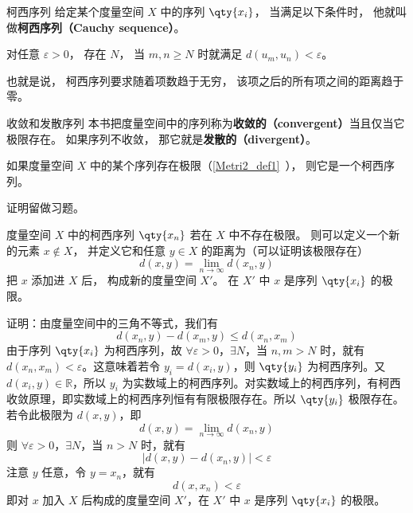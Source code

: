 

\begin{definition}{柯西序列}
给定某个度量空间 $X$ 中的序列 $\qty{x_i}$， 当满足以下条件时， 他就叫做\textbf{柯西序列（Cauchy sequence）}。

对任意 $\varepsilon > 0$， 存在 $N$， 当 $m, n \geqslant N$ 时就满足 $d(u_m, u_n) < \varepsilon$。
\end{definition}
也就是说， 柯西序列要求随着项数趋于无穷， 该项之后的所有项之间的距离趋于零。

\begin{definition}{收敛和发散序列}\label{cauchy_def1}
本书把度量空间中的序列称为\textbf{收敛的（convergent）}当且仅当它极限存在。 如果序列不收敛， 那它就是\textbf{发散的（divergent）}。
\end{definition}

\begin{theorem}{}
如果度量空间 $X$ 中的某个序列存在极限（\autoref{Metri2_def1}~）， 则它是一个柯西序列。
\end{theorem}
证明留做习题。

\begin{theorem}{}\label{cauchy_the1}
度量空间 $X$ 中的柯西序列 $\qty{x_n}$ 若在 $X$ 中不存在极限。 则可以定义一个新的元素 $x \notin X$， 并定义它和任意 $y\in X$ 的距离为（可以证明该极限存在）
\begin{equation}
d(x, y) = \lim_{n\to\infty} d(x_n, y)
\end{equation}
把 $x$ 添加进 $X$ 后， 构成新的度量空间 $X'$。 在 $X'$ 中 $x$ 是序列 $\qty{x_i}$ 的极限。
\end{theorem}
证明：由度量空间中的三角不等式，我们有
\begin{equation}
d(x_n,y)-d(x_m,y)\leq d(x_n,x_m)
\end{equation}
由于序列 $\qty{x_i}$ 为柯西序列，故 $\forall\varepsilon>0$，$\exists N$，当 $n,m>N$ 时，就有 $d(x_n,x_m)<\varepsilon$。这意味着若令 $y_i=d(x_i,y)$，则 $\qty{y_i}$ 为柯西序列。又 $d(x_i,y)\in \mathbb R$，所以 ${y_i}$ 为实数域上的柯西序列。对实数域上的柯西序列，有柯西收敛原理，即实数域上的柯西序列恒有有限极限存在。所以 $\qty{y_i}$ 极限存在。若令此极限为 $d(x,y)$，即
\begin{equation}
d(x, y) = \lim_{n\to\infty} d(x_n, y)
\end{equation}
则 $\forall\varepsilon>0$，$\exists N$，当 $n>N$ 时，就有 
\begin{equation}
|d(x,y)-d(x_n,y)|<\varepsilon
\end{equation}
注意 $y$ 任意，令 $y=x_n$，就有
\begin{equation}
d(x,x_n)<\varepsilon
\end{equation}
即对 $x$ 加入 $X$ 后构成的度量空间 $X'$，在 $X'$ 中 $x$ 是序列 $\qty{x_i}$ 的极限。

